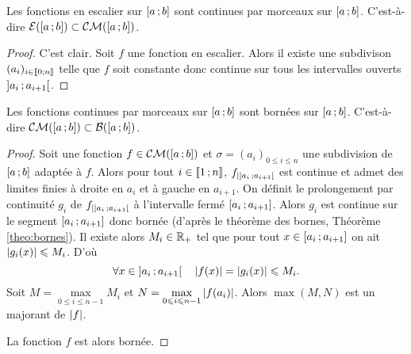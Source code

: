 \begin{prop}
  Les fonctions en escalier sur \(\left[ a \, ;  b \right]\) sont continues par morceaux sur \(\left[ a \, ;  b \right]\). C'est-à-dire \(\mathcal{E}(\left[ a \, ;  b \right]) \subset \mathcal{CM}(\left[ a \, ;  b \right])\).
\end{prop}
\begin{proof}
  C'est clair. Soit \(f\) une fonction en escalier. Alors il existe une subdivison \((a_i)_{i \in \mathopen{\llbracket}0\mathclose{}\mathpunct{};n\mathclose{\rrbracket}}\) telle que \(f\) soit constante donc continue sur tous les intervalles ouverts \(\left] a_i \, ;  a_{i+1} \right[\).
\end{proof}

\begin{prop}
  Les fonctions continues par morceaux sur \(\left[ a \, ;  b \right]\) sont bornées sur \(\left[ a \, ;  b \right]\). C'est-à-dire \(\mathcal{CM}(\left[ a \, ;  b \right]) \subset \mathcal{B}(\left[ a \, ;  b \right])\).
\end{prop}
\begin{proof}
  Soit une fonction \(f \in \mathcal{CM}(\left[ a \, ;  b \right])\) et \(\sigma=(a_i)_{0 
  \leqslant i \leqslant n}\) une subdivision de \(\left[ a \, ;  b \right]\) adaptée 
  à \(f\). Alors pour tout \(i \in \mathopen{\llbracket}1\mathclose{}\mathpunct{};n\mathclose{\rrbracket}\), 
  \(f_{|\left] a_i \, ;  a_{i+1} \right[}\) est continue et admet des limites finies 
  à droite en \(a_{i}\) et à gauche en \(a_{i+1}\). On définit le prolongement 
  par continuité \(g_i\) de \(f_{|\left] a_i \, ;  a_{i+1} \right[}\) à l'intervalle 
  fermé \(\left[ a_i \, ;  a_{i+1} \right]\). Alors \(g_i\) est continue sur le 
  segment \(\left[ a_i \, ;  a_{i+1} \right]\) donc bornée (d'après le théorème des 
  bornes, Théorème~
  \ref{theo:bornes}). Il existe alors \(M_i \in \mathbb{R}_+\) tel que 
  pour tout \(x \in \left[ a_i \, ;  a_{i+1} \right] \) on ait \(\left\lvert g_i(x)\right\rvert 
  \leqslant M_i\). D'où
  \begin{equation}
    \forall x \in \left] a_i \, ;  a_{i+1} \right[ \quad \left\lvert f(x)\right\rvert=\left\lvert g_i(x)\right\rvert \leqslant M_i.
  \end{equation}
  Soit \(M=\max\limits_{0 \leqslant i \leqslant n-1} M_i\) et \(N=\max\limits_{0 \leqslant i \leqslant n-1} \left\lvert f(a_i)\right\rvert\). Alors \(\max(M,N)\) est un majorant de \(\left\lvert f\right\rvert\).

  La fonction \(f\) est alors bornée.
\end{proof}

